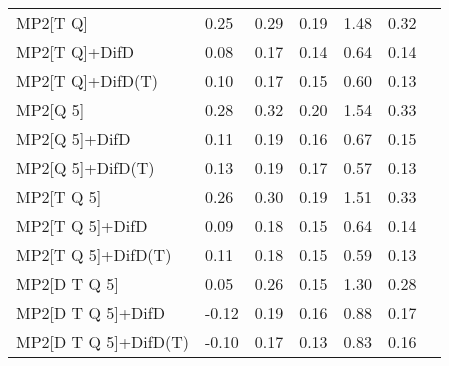 \begin{table}
\begin{tabular}{l l l l l l l }
    MP2[T Q] & 0.25 & 0.29 & 0.19 & 1.48 & 0.32 \\ 
    MP2[T Q]+DifD & 0.08 & 0.17 & 0.14 & 0.64 & 0.14 \\ 
    MP2[T Q]+DifD(T) & 0.10 & 0.17 & 0.15 & 0.60 & 0.13 \\ 
    MP2[Q 5] & 0.28 & 0.32 & 0.20 & 1.54 & 0.33 \\ 
    MP2[Q 5]+DifD & 0.11 & 0.19 & 0.16 & 0.67 & 0.15 \\ 
    MP2[Q 5]+DifD(T) & 0.13 & 0.19 & 0.17 & 0.57 & 0.13 \\ 
    MP2[T Q 5] & 0.26 & 0.30 & 0.19 & 1.51 & 0.33 \\ 
    MP2[T Q 5]+DifD & 0.09 & 0.18 & 0.15 & 0.64 & 0.14 \\ 
    MP2[T Q 5]+DifD(T) & 0.11 & 0.18 & 0.15 & 0.59 & 0.13 \\ 
    MP2[D T Q 5] & 0.05 & 0.26 & 0.15 & 1.30 & 0.28 \\ 
    MP2[D T Q 5]+DifD & -0.12 & 0.19 & 0.16 & 0.88 & 0.17 \\ 
    MP2[D T Q 5]+DifD(T) & -0.10 & 0.17 & 0.13 & 0.83 & 0.16 \\ 
    \hline
  \end{tabular}
\end{table}
